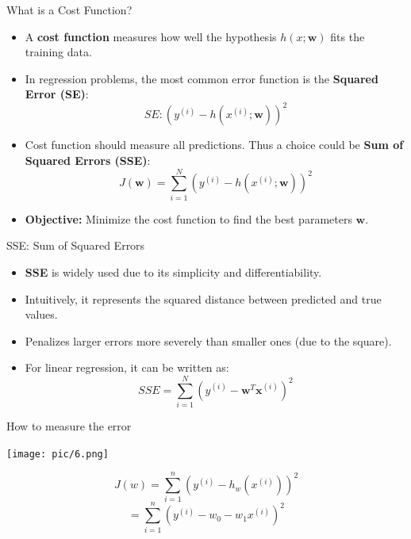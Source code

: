 \documentclass[serif, aspectratio=169]{beamer}
\begin{document}
\begin{frame}{What is a Cost Function?}
    \begin{itemize}
        \item A \textbf{cost function} measures how well the hypothesis \( h(x; \mathbf{w}) \) fits the training data.
        \item In regression problems, the most common error function is the \textbf{Squared Error (SE)}:
            \[
            SE: \left( y^{(i)} - h(x^{(i)}; \mathbf{w}) \right)^2
            \]
        \item Cost function should measure all predictions. Thus a choice could be \textbf{Sum of Squared Errors (SSE)}:
        \[
        J(\mathbf{w}) = \sum_{i=1}^{N} \left( y^{(i)} - h(x^{(i)}; \mathbf{w}) \right)^2
        \]
        \item \textbf{Objective:} Minimize the cost function to find the best parameters \( \mathbf{w} \).

    \end{itemize}

\end{frame}

\begin{frame}{SSE: Sum of Squared Errors}
    \begin{itemize}
        \item \textbf{SSE} is widely used due to its simplicity and differentiability.
        \item Intuitively, it represents the squared distance between predicted and true values.
        \item Penalizes larger errors more severely than smaller ones (due to the square).
        \item For linear regression, it can be written as:
        \[
        SSE = \sum_{i=1}^{N} \left( y^{(i)} - \mathbf{w}^T \mathbf{x}^{(i)} \right)^2
        \]
    \end{itemize}
\end{frame}





\begin{frame}{How to measure the error}

    \begin{minipage}{0.5\textwidth}
        \centering
        \texttt{[image: pic/6.png]}
    \end{minipage}%
    \begin{minipage}{0.5\textwidth}
    
        \[
        J(w) = \sum_{i=1}^{n} \left( y^{(i)} - h_w(x^{(i)}) \right)^2
        \]
        \[
        = \sum_{i=1}^{n} \left( y^{(i)} - w_0 - w_1 x^{(i)} \right)^2
        \]
    \end{minipage}
    \vfill
\end{frame}
\end{document}
